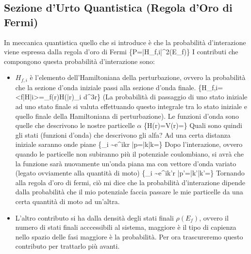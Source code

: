 \subsection{Sezione d'Urto Quantistica (Regola d'Oro di Fermi)}
In meccanica quantistica quello che si introduce è che la probabilità d'interazione viene espressa dalla regola d'oro di Fermi
\{P=\frac{2\pi}{\hbar}|H_{f,i}|^2\rho(E_f)\}
I contributi che compongono questa probabilità d'interazione sono:
\begin{itemize}
\item $H_{f,i}$ è l'elemento dell'Hamiltoniana della perturbazione, ovvero la probabilità che la sezione d'onda iniziale passi alla sezione d'onda finale.
\{H_{f,i}=<f|H|i>=\int \psi*_f(r)H(\bar r)\psi_i d^3r\}
(La probabilità di passaggio di uno stato iniziale ad uno stato finale si valuta effettuando questo integrale tra lo stato iniziale e quello finale della Hamiltoniana di perturbazione).
Le funzioni d'onda sono quelle che descrivono le nostre particelle $\alpha$
\{H(r)=V(r)=\}
Quali sono quindi gli stati (funzioni d'onda) che descrivono gli alfa?
Ad una certa distanza iniziale saranno onde piane
\{\psi_i \sim e^{ikr} \hspace{1cm}\bar p=\hbar\bar k\hspace{0.5cm}\bar k=\}
Dopo l'interazione, ovvero quando le particelle non subiranno più il potenziale coulombiano, si avrà che la funzione sarà nuovamente un'onda piana ma con vettore d'onda variato (legato ovviamente alla quantità di moto)
\{\psi_i \sim e^{ik'r}\hspace{1cm} \bar p'=\hbar\bar k'\hspace{0.5cm}\bar k'=\}
Tornando alla regola d'oro di fermi, ciò mi dice che la probabilità d'interazione dipende dalla probabilità che il mio potenziale faccia passare le mie particelle da una certa quantità di moto ad un'altra.

\item L'altro contributo si ha dalla densità degli stati finali $\rho(E_f)$, ovvero il numero di stati finali acccessibili al sistema, maggiore è il tipo di capienza nello spazio delle fasi maggiore è la probabilità. Per ora trascureremo questo contributo per trattarlo più avanti.
\end{itemize}


